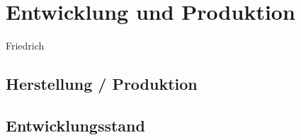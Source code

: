 
\section{Entwicklung und Produktion}
Friedrich

\subsection{Herstellung / Produktion}
\subsection{Entwicklungsstand}